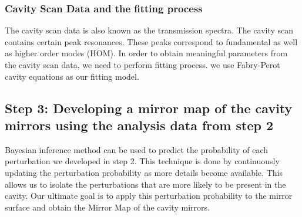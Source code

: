 \documentclass[colorlinks=true,pdfstartview=FitV,linkcolor=blue,
            citecolor=red,urlcolor=magenta]{ligodoc}
\begin{document}
\subsubsection {Cavity Scan Data and the fitting process}
The cavity scan data is also known as the transmission spectra. The cavity scan contains certain peak resonances. These peaks correspond to fundamental as well as higher order modes (HOM). In order to obtain meaningful parameters from the cavity scan data, we need to perform fitting process. we use Fabry-Perot cavity equations as our fitting model.
 
\subsection{Step 3: Developing a mirror map of the cavity mirrors using the analysis data from step 2 }
Bayesian inference method can be used to predict the probability of each perturbation we developed in step 2. This technique is done by continuously updating the perturbation probability as more details become available. This allows us to isolate the perturbations that are more likely to be present in the cavity. Our ultimate goal is to apply this perturbation probability to the mirror surface and obtain the Mirror Map of the cavity mirrors.
\end{document}
